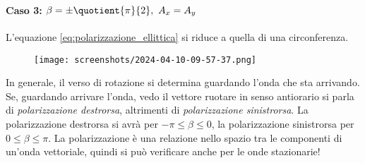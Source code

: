 \paragraph{Caso 3: \(\beta =\pm \quotient{\pi }{2},\ A_x=A_y \)}
L'equazione \eqref{eq:polarizzazione_ellittica} si riduce a quella di una circonferenza.
\begin{figure}[H]
	\centering
	\texttt{[image: screenshots/2024-04-10-09-57-37.png]}
\end{figure}
In generale, il verso di rotazione si determina guardando l'onda che sta arrivando. Se, guardando arrivare l'onda, vedo il vettore ruotare in senso antiorario si parla di \emph{polarizzazione destrorsa}, altrimenti di \emph{polarizzazione sinistrorsa}. La polarizzazione destrorsa si avrà per \(-\pi \leq \beta \leq 0\), la polarizzazione sinistrorsa per \(0\leq \beta \leq \pi \). La polarizzazione è una relazione nello spazio tra le componenti di un'onda vettoriale, quindi si può verificare anche per le onde stazionarie!